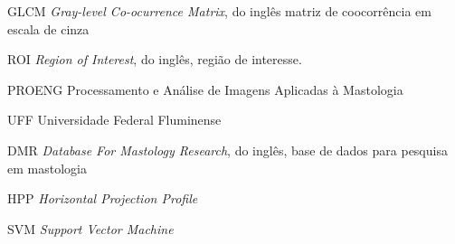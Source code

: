 
\begin{siglas}
    \item[GLCM] \textit{Gray-level Co-ocurrence Matrix}, do inglês matriz de coocorrência em escala de cinza
    \item[ROI] \textit{Region of Interest}, do inglês, região de interesse.
    \item[PROENG] Processamento e Análise de Imagens Aplicadas à Mastologia
    \item[UFF] Universidade Federal Fluminense
    \item[DMR] \textit{Database For Mastology Research}, do inglês, base de dados para pesquisa em mastologia
    \item[HPP] \textit{Horizontal Projection Profile}
    \item[SVM] \textit{Support Vector Machine}
\end{siglas}

